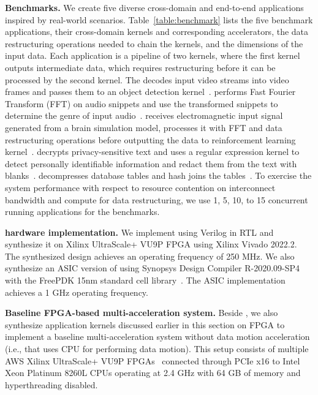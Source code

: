 \noindent \textbf{Benchmarks.}
%
We create five diverse cross-domain and end-to-end applications inspired by real-world scenarios. 
%
Table~\ref{table:benchmark} lists the five benchmark applications, their cross-domain kernels and corresponding accelerators, the data restructuring operations needed to chain the kernels, and the dimensions of the input data.
%
Each application is a pipeline of two kernels, where the first kernel outputs intermediate data, which requires restructuring before it can be processed by the second kernel.
%
The  decodes input video streams into video frames and passes them to an object detection kernel~\cite{yolov3}.
%
 performs Fast Fourier Transform (FFT) on audio snippets and use the transformed snippets to determine the genre of input audio~\cite{urbansound-dataset:mm:2014}.
%
 receives electromagnetic input signal generated from a brain simulation model, processes it with FFT and data restructuring operations before outputting the data to reinforcement learning kernel~\cite{rldbs:ijcai:2020}. 
%
 decrypts privacy-sensitive text and uses a regular expression kernel to detect personally identifiable information and redact them from the text with blanks~\cite{microsoft-presidio}. 
%
 decompresses database tables and hash joins the tables~\cite{doppiodb:fpl:2017,chiosa:pvldb:2022}.   
%
To exercise the system performance with respect to resource contention on interconnect bandwidth and compute for data restructuring, we use 1, 5, 10, to 15 concurrent running applications for the benchmarks.
%

\noindent \textbf{\drx hardware implementation.}
%
We implement \drx using Verilog in RTL and synthesize it on Xilinx UltraScale+ VU9P FPGA using Xilinx Vivado 2022.2. The synthesized design achieves an operating frequency of 250 MHz. We also synthesize an ASIC version of \drx using Synopsys Design Compiler R-2020.09-SP4 with the FreePDK 15nm standard cell library~\cite{freepdk:mse:2007}. The ASIC implementation achieves a 1 GHz operating frequency.
% 

\noindent \textbf{Baseline FPGA-based multi-acceleration system.}
Beside \drx, we also synthesize application kernels discussed earlier in this section on FPGA to implement a baseline multi-acceleration system without data motion acceleration (i.e., that uses CPU for performing data motion). This setup consists of multiple AWS Xilinx UltraScale+ VU9P FPGAs~\cite{amazon_ec2_f1} connected through PCIe x16 to Intel Xeon Platinum 8260L CPUs operating at 2.4 GHz with 64 GB of memory and hyperthreading disabled.
% 

